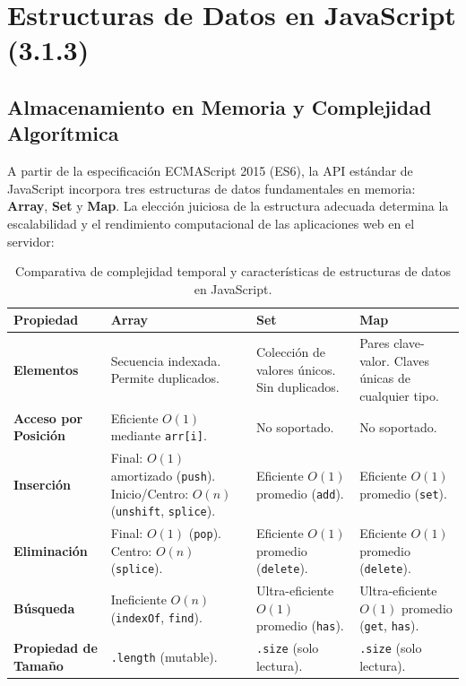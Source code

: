 \section{Estructuras de Datos en JavaScript (3.1.3)}

\subsection{Almacenamiento en Memoria y Complejidad Algorítmica}

A partir de la especificación ECMAScript 2015 (ES6), la API estándar de JavaScript incorpora tres estructuras de datos fundamentales en memoria: \textbf{Array}, \textbf{Set} y \textbf{Map}. La elección juiciosa de la estructura adecuada determina la escalabilidad y el rendimiento computacional de las aplicaciones web en el servidor:

\begin{table}[htbp]
\centering
\small
\begin{tabularx}{\textwidth}{p{2.8cm} X X X}
\toprule
\textbf{Propiedad} & \textbf{Array} & \textbf{Set} & \textbf{Map} \\
\midrule
\textbf{Elementos} & Secuencia indexada. Permite duplicados. & Colección de valores únicos. Sin duplicados. & Pares clave-valor. Claves únicas de cualquier tipo. \\
\addlinespace
\textbf{Acceso por Posición} & Eficiente $O(1)$ mediante \texttt{arr[i]}. & No soportado. & No soportado. \\
\addlinespace
\textbf{Inserción} & Final: $O(1)$ amortizado (\texttt{push}). Inicio/Centro: $O(n)$ (\texttt{unshift}, \texttt{splice}). & Eficiente $O(1)$ promedio (\texttt{add}). & Eficiente $O(1)$ promedio (\texttt{set}). \\
\addlinespace
\textbf{Eliminación} & Final: $O(1)$ (\texttt{pop}). Centro: $O(n)$ (\texttt{splice}). & Eficiente $O(1)$ promedio (\texttt{delete}). & Eficiente $O(1)$ promedio (\texttt{delete}). \\
\addlinespace
\textbf{Búsqueda} & Ineficiente $O(n)$ (\texttt{indexOf}, \texttt{find}). & Ultra-eficiente $O(1)$ promedio (\texttt{has}). & Ultra-eficiente $O(1)$ promedio (\texttt{get}, \texttt{has}). \\
\addlinespace
\textbf{Propiedad de Tamaño} & \texttt{.length} (mutable). & \texttt{.size} (solo lectura). & \texttt{.size} (solo lectura). \\
\bottomrule
\end{tabularx}
\caption{Comparativa de complejidad temporal y características de estructuras de datos en JavaScript.}
\label{tab:estructuras-datos}
\end{table}

